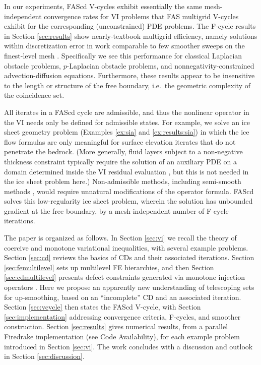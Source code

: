 \documentclass[letterpaper,final,12pt,reqno]{amsart}
\theoremstyle{cstyle}
\theoremstyle{cstyle*}
\theoremstyle{dstyle}
\numberwithin{equation}{section}
\numberwithin{figure}{section}
\numberwithin{table}{section}
\numberwithin{theorem}{section}
\begin{document}
In our experiments, FAScd V-cycles exhibit essentially the same mesh-independent convergence rates for VI problems that FAS multigrid V-cycles exhibit for the corresponding (unconstrained) PDE problems.  The F-cycle results in Section \ref{sec:results} show nearly-textbook multigrid efficiency, namely solutions within discretization error in work comparable to few smoother sweeps on the finest-level mesh \cite{BrandtLivne2011}.  Specifically we see this performance for classical Laplacian obstacle problems, $p$-Laplacian obstacle problems, and nonnegativity-constrained advection-diffusion equations.  Furthermore, these results appear to be insensitive to the length or structure of the free boundary, i.e.~the geometric complexity of the coincidence set.

All iterates in a FAScd cycle are admissible, and thus the nonlinear operator in the VI needs only be defined for admissible states.  For example, we solve an ice sheet geometry problem (Examples \ref{ex:sia} and \ref{ex:results:sia}) in which the ice flow formulas are only meaningful for surface elevation iterates that do not penetrate the bedrock.  (More generally, fluid layers subject to a non-negative thickness constraint typically require the solution of an auxiliary PDE on a domain determined inside the VI residual evaluation \cite{Bueler2021conservation}, but this is not needed in the ice sheet problem here.)  Non-admissible methods, including semi-smooth methods \cite{BensonMunson2006}, would require unnatural modifications of the operator formula.  FAScd solves this low-regularity ice sheet problem, wherein the solution has unbounded gradient at the free boundary, by a mesh-independent number of F-cycle iterations.

The paper is organized as follows.  In Section \ref{sec:vi} we recall the theory of coercive and monotone variational inequalities, with several example problems.  Section \ref{sec:cd} reviews the basics of CDs and their associated iterations.  Section \ref{sec:femultilevel} sets up multilevel FE hierarchies, and then Section \ref{sec:cdmultilevel} presents defect constraints generated via monotone injection operators \cite{GraeserKornhuber2009}.  Here we propose an apparently new understanding of telescoping sets for up-smoothing, based on an ``incomplete'' CD and an associated iteration.  Section \ref{sec:vcycle} then states the FAScd V-cycle, with Section \ref{sec:implementation} addressing convergence criteria, F-cycles, and smoother construction.  Section \ref{sec:results} gives numerical results, from a parallel Firedrake \cite{Rathgeberetal2016} implementation (see Code Availability), for each example problem introduced in Section \ref{sec:vi}.  The work concludes with a discussion and outlook in Section \ref{sec:discussion}.
\end{document}
